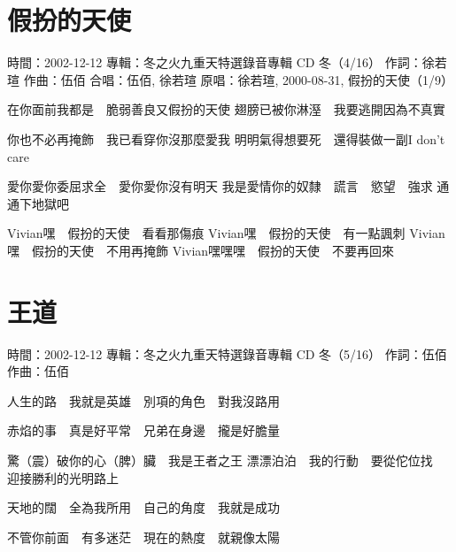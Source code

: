 \documentclass[UTF8,a4paper,oneside,twocolumn,12pt]{ctexbook}
\newcommand{\infopair}[2]{\textbullet #1：#2}
\newcommand{\zc}[1][伍佰]{\infopair{作詞}{#1}}
\newcommand{\zq}[1][伍佰]{\infopair{作曲}{#1}}
\newcommand{\zj}[1]{\infopair{專輯}{#1}}
\newcommand{\yc}[1]{\infopair{原唱}{#1}}
\newcommand{\sj}[1]{\infopair{時間}{#1}}
\newenvironment{info}{\begin{flushleft}\kaishu
	}
	{\end{flushleft}\normalsize\yahei\par}
\newenvironment{lyric}{
	}
{}
\begin{document}
\section{假扮的天使}
\begin{info}
	\sj{2002-12-12}
	\zj{冬之火九重天特選錄音專輯 CD 冬（4/16）}
	\zc[徐若瑄]
	\zq
	\infopair{合唱}{伍佰, 徐若瑄}
	\yc{徐若瑄, 2000-08-31, 假扮的天使（1/9）}
\end{info}
\begin{lyric}
	在你面前我都是　脆弱善良又假扮的天使
	翅膀已被你淋溼　我要逃開因為不真實

	你也不必再掩飾　我已看穿你沒那麼愛我
	明明氣得想要死　還得裝做一副I don't care

	愛你愛你委屈求全　愛你愛你沒有明天
	我是愛情你的奴隸　謊言　慾望　強求
	通通下地獄吧

	Vivian嘿　假扮的天使　看看那傷痕
	Vivian嘿　假扮的天使　有一點諷刺
	Vivian嘿　假扮的天使　不用再掩飾
	Vivian嘿嘿嘿　假扮的天使　不要再回來
\end{lyric}

\section{王道}
\begin{info}
	\sj{2002-12-12}
	\zj{冬之火九重天特選錄音專輯 CD 冬（5/16）}
	\zc
	\zq
\end{info}
\begin{lyric}
	人生的路　我就是英雄　別項的角色　對我沒路用

	赤焰的事　真是好平常　兄弟在身邊　攏是好膽量

	驚（震）破你的心（脾）臟　我是王者之王
	漂漂泊泊　我的行動　要從佗位找　迎接勝利的光明路上

	天地的闊　全為我所用　自己的角度　我就是成功

	不管你前面　有多迷茫　現在的熱度　就親像太陽
\end{lyric}
\end{document}
